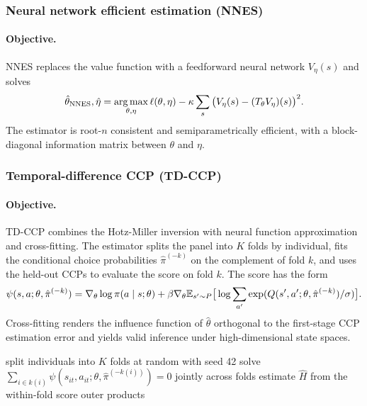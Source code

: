 \subsubsection{Neural network efficient estimation (NNES)}

\paragraph{Objective.} NNES \citep{nguyen2025nnes} replaces the value function with a feedforward neural network $V_\eta(s)$ and solves
\begin{equation}
\hat\theta_{\mathrm{NNES}}, \hat\eta = \operatorname*{arg\,max}_{\theta, \eta} \ell(\theta, \eta) - \kappa \sum_s \big( V_\eta(s) - (T_\theta V_\eta)(s) \big)^2.
\label{eq:nnes}
\end{equation}
The estimator is root-$n$ consistent and semiparametrically efficient, with a block-diagonal information matrix between $\theta$ and $\eta$.

\subsubsection{Temporal-difference CCP (TD-CCP)}

\paragraph{Objective.} TD-CCP \citep{adusumilli2025tdccp} combines the Hotz-Miller inversion with neural function approximation and cross-fitting. The estimator splits the panel into $K$ folds by individual, fits the conditional choice probabilities $\hat\pi^{(-k)}$ on the complement of fold $k$, and uses the held-out CCPs to evaluate the score on fold $k$. The score has the form
\begin{equation}
\psi(s, a; \theta, \hat\pi^{(-k)}) = \nabla_\theta \log \pi(a \mid s; \theta) + \beta \nabla_\theta \mathbb{E}_{s' \sim P} \big[ \log \sum_{a'} \exp(Q(s', a'; \theta, \hat\pi^{(-k)})/\sigma) \big].
\label{eq:tdccp}
\end{equation}
Cross-fitting renders the influence function of $\hat\theta$ orthogonal to the first-stage CCP estimation error and yields valid inference under high-dimensional state spaces.

\begin{algorithm}[H]
\SetAlgoLined
{}
split individuals into $K$ folds at random with seed 42\;
solve $\sum_{i \in k(i)} \psi(s_{it}, a_{it}; \theta, \hat\pi^{(-k(i))}) = 0$ jointly across folds\;
estimate $\hat H$ from the within-fold score outer products\;
\caption{Cross-fit TD-CCP}
\end{algorithm}

